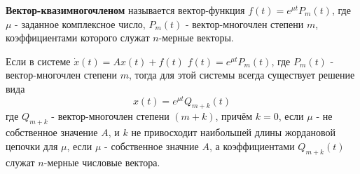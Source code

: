 \begin{definition}
  \textbf{Вектор-квазимногочленом} называется вектор-функция $f(t) = e^{\mu t} P_m(t)$, где $\mu$ - заданное комплексное число, $P_m(t)$ - вектор-многочлен степени $m$, коэффициентами которого служат $n$-мерные векторы. 
\end{definition}

\begin{theorem}
  Если в системе $\dot{x}(t) = A x(t) + f(t)$ $f(t) = e^{\mu t} P_m(t)$, где $P_m(t)$ - вектор-многочлен степени $m$, тогда для этой системы всегда существует решение вида
  \[ x(t) = e^{\mu t} Q_{m+k}(t)\]
  где $Q_{m + k}$ - вектор-многочлен степени $(m + k)$, причём $k = 0$, если $\mu$ - не собственное значение $A$, и $k$ не привосходит наибольшей длины жордановой цепочки для $\mu$, если $\mu$ - собственное значние $A$, а коэффициентами $Q_{m+k}(t)$ служат $n$-мерные числовые вектора.
\end{theorem}

